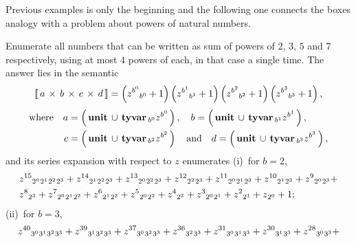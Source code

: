 Previous examples is only the beginning and the following one connects
the boxes analogy with a problem about powers of natural numbers.

\begin{example}
Enumerate all numbers that can be written as sum of powers of $2$, $3$, $5$ and
$7$ respectively, using at most $4$ powers of each, in that case a single time.
The answer lies in the semantic
\begin{displaymath}
\left\llbracket\,a\,\times\,b\,\times\,c\,\times\,d\,\right\rrbracket = \left(z^{b^{0}} {\space}_{b^{0}} + 1\right) \left(z^{b^{1}} {\space}_{b^{1}} + 1\right) \left(z^{b^{2}} {\space}_{b^{2}} + 1\right) \left(z^{b^{3}} {\space}_{b^{3}} + 1\right),
\end{displaymath}
\begin{displaymath}
\begin{split}
\text{where}\quad
    a &= \left(\,\textbf{unit}\,\cup\,\textbf{tyvar}\,{\space}_{b^{0}} z^{b^{0}}\,\right),\quad
        b = \left(\,\textbf{unit}\,\cup\,\textbf{tyvar}\,{\space}_{b^{1}} z^{b^{1}}\,\right),\\
    c &= \left(\,\textbf{unit}\,\cup\,\textbf{tyvar}\,{\space}_{b^{2}} z^{b^{2}}\,\right)\quad\text{and}\quad
        d = \left(\,\textbf{unit}\,\cup\,\textbf{tyvar}\,{\space}_{b^{3}} z^{b^{3}}\,\right),
\end{split}
\end{displaymath}
and its series expansion with respect to $z$ enumerates (i)~for $b=2$,
\begin{displaymath}
\begin{split}
&z^{15} {\space}_{2^{0}} {\space}_{2^{1}} {\space}_{2^{2}} {\space}_{2^{3}} + z^{14} {\space}_{2^{1}} {\space}_{2^{2}} {\space}_{2^{3}} + z^{13} {\space}_{2^{0}} {\space}_{2^{2}} {\space}_{2^{3}} + z^{12} {\space}_{2^{2}} {\space}_{2^{3}} + z^{11} {\space}_{2^{0}} {\space}_{2^{1}} {\space}_{2^{3}} + z^{10} {\space}_{2^{1}} {\space}_{2^{3}} + z^{9} {\space}_{2^{0}} {\space}_{2^{3}} + \\
&z^{8} {\space}_{2^{3}} + z^{7} {\space}_{2^{0}} {\space}_{2^{1}} {\space}_{2^{2}} + z^{6} {\space}_{2^{1}} {\space}_{2^{2}} + z^{5} {\space}_{2^{0}} {\space}_{2^{2}} + z^{4} {\space}_{2^{2}} + z^{3} {\space}_{2^{0}} {\space}_{2^{1}} + z^{2} {\space}_{2^{1}} + z {\space}_{2^{0}} + 1;
\end{split}
\end{displaymath}
(ii)~for $b=3$,
\begin{displaymath}
\begin{split}
&z^{40} {\space}_{3^{0}} {\space}_{3^{1}} {\space}_{3^{2}} {\space}_{3^{3}} + z^{39} {\space}_{3^{1}} {\space}_{3^{2}} {\space}_{3^{3}} + z^{37} {\space}_{3^{0}} {\space}_{3^{2}} {\space}_{3^{3}} + z^{36} {\space}_{3^{2}} {\space}_{3^{3}} + z^{31} {\space}_{3^{0}} {\space}_{3^{1}} {\space}_{3^{3}} + z^{30} {\space}_{3^{1}} {\space}_{3^{3}} + z^{28} {\space}_{3^{0}} {\space}_{3^{3}} + \\

\end{split}
\end{displaymath}
\end{example}
